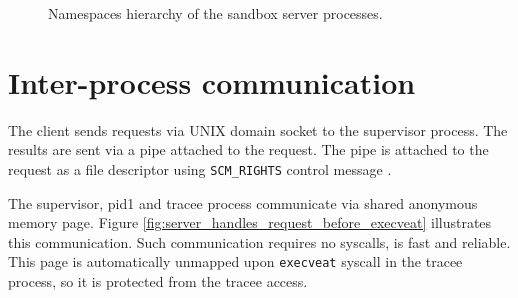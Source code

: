 \documentclass[en]{pracamgr}
\begin{document}
\begin{figure}[h]
\caption{Namespaces hierarchy of the sandbox server processes.}
\label{fig:server_namespaces}
\end{figure}

\section{Inter-process communication}

The client sends requests via UNIX domain socket to the supervisor process. The results are sent via a pipe attached to the request. The pipe is attached to the request as a file descriptor using \texttt{SCM\_RIGHTS} control message \cite{man_unix}.

The supervisor, pid1 and tracee process communicate via shared anonymous memory page. Figure \ref{fig:server_handles_request_before_execveat} illustrates this communication. Such communication requires no syscalls, is fast and reliable. This page is automatically unmapped upon \texttt{execveat} syscall \cite{man_execveat} in the tracee process, so it is protected from the tracee access.
\end{document}
